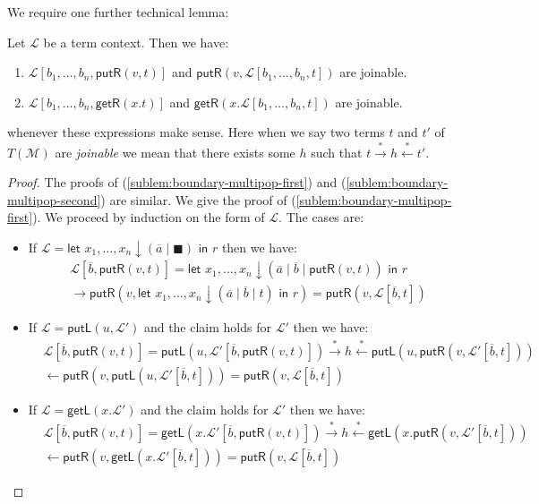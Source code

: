 \documentclass[twoside,11pt,final]{entics}
\newcommand{\getl}{\mathsf{getL}}
\newcommand{\putr}{\mathsf{putR}}
\newcommand{\getr}{\mathsf{getR}}
\newcommand{\putl}{\mathsf{putL}}
\newcommand{\from}{\leftarrow}
\newcommand{\asn}{\downarrow}
\newcommand{\seq}{,\!\ldots\!,}
\begin{document}
We require one further technical lemma:
\begin{lemma}\label{lem:boundary-multipop}
  Let $\mathcal{L}$ be a term context. Then we have:
  \begin{enumerate}
  \item\label{sublem:boundary-multipop-first} $\mathcal{L}[b_1\seq b_n , \putr(v,t)]$ and $\putr(v,\mathcal{L}[b_1 \seq b_n , t])$ are joinable.
  \item\label{sublem:boundary-multipop-second} $\mathcal{L}[b_1\seq b_n ,\getr(x.t)]$ and $\getr(x.\mathcal{L}[b_1 \seq b_n,t])$ are joinable.
  \end{enumerate}
  whenever these expressions make sense. Here when we say two terms $t$ and $t'$ of $T(\mathcal{M})$ are \emph{joinable} we mean that there exists some $h$ such that $t \stackrel{*}{\to} h \stackrel{*}{\from} t'$.
\end{lemma}
\begin{proof}
  The proofs of (\ref{sublem:boundary-multipop-first}) and (\ref{sublem:boundary-multipop-second}) are similar. We give the proof of (\ref{sublem:boundary-multipop-first}). We proceed by induction on the form of $\mathcal{L}$. The cases are:
  \begin{itemize}
  \item If $\mathcal{L} = \textsf{let } x_1 \seq x_n \asn (\overline{a} \mid \blacksquare) \textsf{ in } r$ then we have:
    \begin{align*}
      & \mathcal{L}[\overline{b} , \putr(v,t)]
        = \textsf{let } x_1 \seq x_n \asn (\overline{a} \mid \overline{b} \mid \putr(v,t)) \textsf{ in } r
        \\& \to \putr(v,\textsf{let } x_1 \seq x_n \asn (\overline{a} \mid \overline{b} \mid t) \textsf{ in } r)
        = \putr(v,\mathcal{L}[\overline{b} , t])
    \end{align*}
  \item If $\mathcal{L} = \putl(u,\mathcal{L}')$ and the claim holds for $\mathcal{L}'$ then we have:
    \begin{align*}
      & \mathcal{L}[\overline{b} , \putr(v,t)]
        = \putl(u,\mathcal{L}'[\overline{b} , \putr(v,t)])
        \stackrel{*}{\to} h
        \stackrel{*}{\from} \putl(u,\putr(v,\mathcal{L}'[\overline{b} , t]))
        \\& \from \putr(v,\putl(u,\mathcal{L}'[\overline{b} , t]))
        = \putr(v,\mathcal{L}[\overline{b} , t])
    \end{align*}
  \item If $\mathcal{L} = \getl(x.\mathcal{L}')$ and the claim holds for $\mathcal{L}'$ then we have:
    \begin{align*}
      & \mathcal{L}[\overline{b} , \putr(v,t)]
        = \getl(x.\mathcal{L}'[\overline{b} , \putr(v,t)])
        \stackrel{*}{\to} h
        \stackrel{*}{\from} \getl(x.\putr(v,\mathcal{L}'[\overline{b} , t]))
      \\& \from \putr(v,\getl(x.\mathcal{L}'[\overline{b} , t]))
      = \putr(v,\mathcal{L}[\overline{b} , t])
    \end{align*}
  \end{itemize}
\end{proof}
\end{document}
